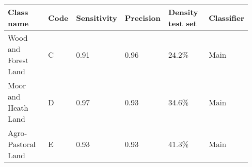 \begin{tabular}{llllll}
\toprule
 \textbf{Class name} & \textbf{Code} & \textbf{Sensitivity} & \textbf{Precision} & \textbf{Density test set} & \textbf{Classifier} \\
\midrule
Wood and Forest Land &             C &                 0.91 &               0.96 &                    24.2\% &                Main \\
 Moor and Heath Land &             D &                 0.97 &               0.93 &                    34.6\% &                Main \\
  Agro-Pastoral Land &             E &                 0.93 &               0.93 &                    41.3\% &                Main \\
\bottomrule
\end{tabular}
